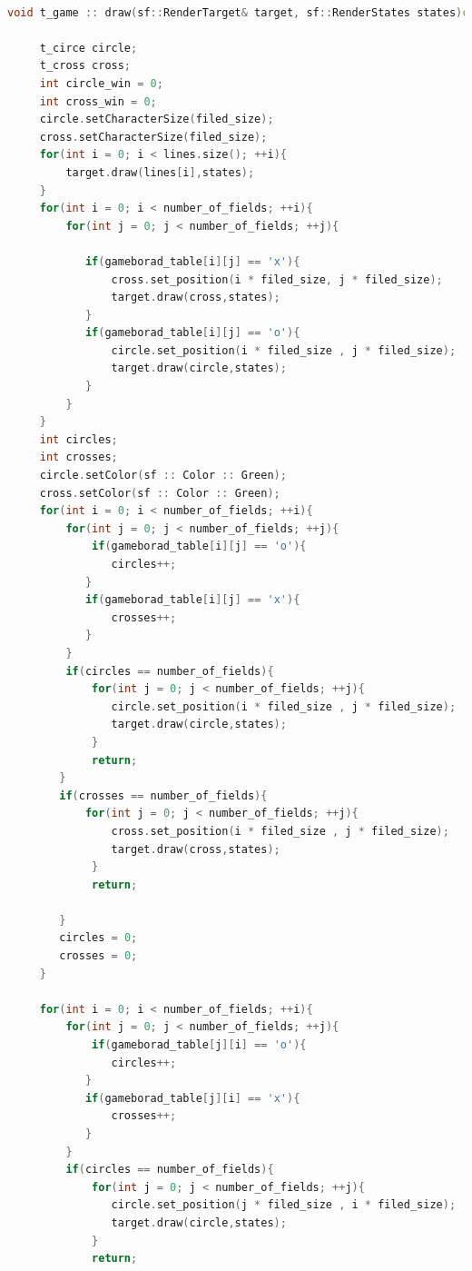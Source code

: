 \documentclass[12pt]{article}
\begin{document}
    \begin{lstlisting}[language=C++, caption=draw()]
        
void t_game :: draw(sf::RenderTarget& target, sf::RenderStates states)const{
    
     t_circe circle;
     t_cross cross;
     int circle_win = 0;
     int cross_win = 0;
     circle.setCharacterSize(filed_size);
     cross.setCharacterSize(filed_size);
     for(int i = 0; i < lines.size(); ++i){
         target.draw(lines[i],states);
     }
     for(int i = 0; i < number_of_fields; ++i){
         for(int j = 0; j < number_of_fields; ++j){
             
            if(gameborad_table[i][j] == 'x'){
                cross.set_position(i * filed_size, j * filed_size);
                target.draw(cross,states);
            }
            if(gameborad_table[i][j] == 'o'){
                circle.set_position(i * filed_size , j * filed_size);
                target.draw(circle,states);
            }
         }
     }
     int circles;
     int crosses;
     circle.setColor(sf :: Color :: Green);
     cross.setColor(sf :: Color :: Green);
     for(int i = 0; i < number_of_fields; ++i){
         for(int j = 0; j < number_of_fields; ++j){
             if(gameborad_table[i][j] == 'o'){
                circles++;
            }
            if(gameborad_table[i][j] == 'x'){
                crosses++;
            }
         }
         if(circles == number_of_fields){
             for(int j = 0; j < number_of_fields; ++j){
                circle.set_position(i * filed_size , j * filed_size);
                target.draw(circle,states);
             }
             return;
        }
        if(crosses == number_of_fields){
            for(int j = 0; j < number_of_fields; ++j){
                cross.set_position(i * filed_size , j * filed_size);
                target.draw(cross,states);
             }
             return;

        }
        circles = 0;
        crosses = 0;
     }  

     for(int i = 0; i < number_of_fields; ++i){
         for(int j = 0; j < number_of_fields; ++j){
             if(gameborad_table[j][i] == 'o'){
                circles++;
            }
            if(gameborad_table[j][i] == 'x'){
                crosses++;
            }
         }
         if(circles == number_of_fields){
             for(int j = 0; j < number_of_fields; ++j){
                circle.set_position(j * filed_size , i * filed_size);
                target.draw(circle,states);
             }
             return;


\end{lstlisting}
\end{document}

